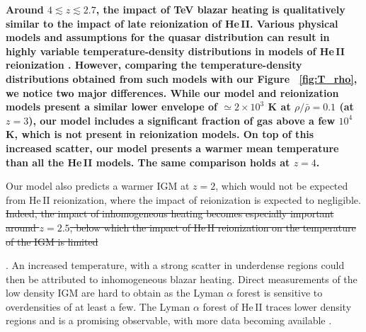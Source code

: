 \documentclass[numberedappendix]{emulateapj}
\newcommand\ALc[1]{{\color{red} \bf #1}} %
\begin{document}
\ALc{Around $4\lesssim z \lesssim 2.7$, the impact of TeV blazar heating is qualitatively similar to the impact of late reionization of He\,\textsc{II}.  Various physical models and assumptions for the quasar distribution can result in highly variable temperature-density distributions in models of He\,\textsc{II} reionization \citep{2004MNRAS.348L..43B,2009ApJ...694..842M}. However, comparing the temperature-density distributions  obtained from such models with our Figure ~\ref{fig:T_rho},  we notice two major differences. While our model and reionization models present a similar lower envelope of $\simeq 2\times 10^3$ K at $\rho/\bar{\rho}=0.1$ (at $z=3$), our model includes a significant fraction of gas above a few $10^4$ K, which is not present in reionization models. On top of this increased scatter, our model presents a warmer mean temperature than all the He\,\textsc{II} models. The same comparison holds at $z=4$. 


Our model also predicts a warmer IGM at $z=2$, which would not be expected from He\,\textsc{II} reionization, where the impact of reionization is expected to negligible.  \sout{Indeed, the impact of inhomogeneous heating becomes especially important around $z=2.5$, below which the impact of He\,\textsc{II} reionization on the temperature of the IGM is limited \citep{2013MNRAS.435.3169C}}}. An increased temperature, with a strong scatter in underdense regions could then be attributed to inhomogeneous blazar heating. Direct measurements of the low density IGM are hard to obtain as the Lyman $\alpha$ forest is sensitive to overdensities of at least a few. The Lyman $\alpha$ forest of He\,\textsc{II} traces lower density regions and is a promising observable, with more data becoming available \citep{2014arXiv1405.7405W}.
\end{document}
